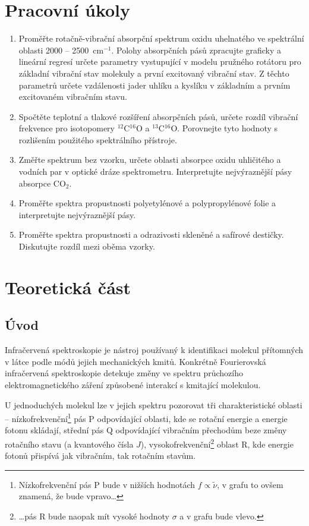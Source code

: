 \documentclass[10pt,a4paper]{article}
\renewcommand{\U}[1]{\ensuremath{\,\mathrm{#1}}}
\newcommand{\°}{\degree}
\begin{document}


\section{Pracovní úkoly}
\begin{enumerate}
    \item Proměřte rotačně-vibrační absorpční spektrum oxidu uhelnatého ve spektrální oblasti 2000 – 2500 $\U{cm^{-1}}$. Polohy absorpčních pásů zpracujte graficky a lineární regresí určete parametry vystupující v modelu pružného rotátoru pro základní vibrační stav molekuly a první excitovaný vibrační stav. Z těchto parametrů určete vzdálenosti jader uhlíku a kyslíku v základním a prvním excitovaném vibračním stavu.
    \item Spočtěte teplotní a tlakové rozšíření absorpčních pásů, určete rozdíl vibrační frekvence pro isotopomery $^{12}$C$^{16}$O a $^{13}$C$^{16}$O. Porovnejte tyto hodnoty s rozlišením použitého spektrálního přístroje.
    \item Změřte spektrum bez vzorku, určete oblasti absorpce oxidu uhličitého a vodních par v optické dráze spektrometru. Interpretujte nejvýraznější pásy absorpce CO$_2$.
    \item Proměřte spektra propustnosti polyetylénové a polypropylénové folie a interpretujte nejvýraznější pásy.
    \item Proměřte spektra propustnosti a odrazivosti skleněné a safírové destičky. Diskutujte rozdíl mezi oběma vzorky.
\end{enumerate}


\section{Teoretická část}

\subsection{Úvod}

Infračervená spektroskopie je nástroj používaný k identifikaci molekul přítomných v látce podle módů jejich mechanických kmitů. Konkrétně Fourierovská infračervená spektroskopie detekuje změny ve spektru průchozího elektromagnetického záření způsobené interakcí s kmitající molekulou.

U jednoduchých molekul lze v jejich spektru pozorovat tři charakteristické oblasti –
nízkofrekvenční\footnote{Nízkofrekvenční pás P bude v nižších hodnotách $f \propto \tilde{\nu}$, v grafu to ovšem znamená, že bude vpravo\dots} pás P odpovídající oblasti, kde se rotační energie a energie fotonu skládají, střední pás Q odpovídající vibračním přechodům beze změny rotačního stavu (a kvantového čísla $J$), vysokofrekvenční\footnote{\dots pás R bude naopak mít vysoké hodnoty $\sigma$ a v grafu bude vlevo.} oblast R, kde energie fotonů přispívá jak vibračním, tak rotačním stavům. \cite{studijni-text}
\end{document}
